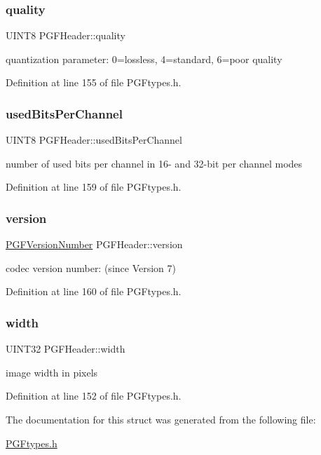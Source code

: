 \subsubsection{\texorpdfstring{quality}{quality}}
{\footnotesize\ttfamily U\+I\+N\+T8 P\+G\+F\+Header\+::quality}



quantization parameter\+: 0=lossless, 4=standard, 6=poor quality 



Definition at line 155 of file P\+G\+Ftypes.\+h.

\mbox{\label{structPGFHeader_abddcc9ee6e17690986cf77a6d16aceb6}} 
\subsubsection{\texorpdfstring{usedBitsPerChannel}{usedBitsPerChannel}}
{\footnotesize\ttfamily U\+I\+N\+T8 P\+G\+F\+Header\+::used\+Bits\+Per\+Channel}



number of used bits per channel in 16-\/ and 32-\/bit per channel modes 



Definition at line 159 of file P\+G\+Ftypes.\+h.

\mbox{\label{structPGFHeader_a637699477fb97e62d8cc3c102fac1fbb}} 
\subsubsection{\texorpdfstring{version}{version}}
{\footnotesize\ttfamily \mbox{\hyperlink{structPGFVersionNumber}{P\+G\+F\+Version\+Number}} P\+G\+F\+Header\+::version}



codec version number\+: (since Version 7) 



Definition at line 160 of file P\+G\+Ftypes.\+h.

\mbox{\label{structPGFHeader_a766a68c3284c2ae6d2f54c82e7350ed9}} 
\subsubsection{\texorpdfstring{width}{width}}
{\footnotesize\ttfamily U\+I\+N\+T32 P\+G\+F\+Header\+::width}



image width in pixels 



Definition at line 152 of file P\+G\+Ftypes.\+h.



The documentation for this struct was generated from the following file\+:\begin{DoxyCompactItemize}
\item 
\mbox{\hyperlink{PGFtypes_8h}{P\+G\+Ftypes.\+h}}\end{DoxyCompactItemize}
